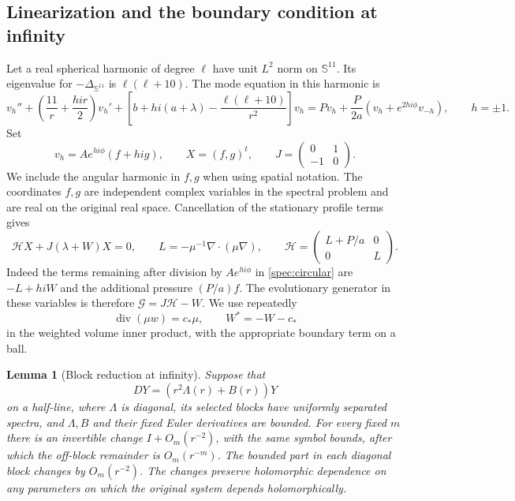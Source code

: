 \documentclass[11pt]{article}
\numberwithin{equation}{section}
\newtheorem{lemma}[theorem]{Lemma}
\theoremstyle{definition}
\theoremstyle{remark}
\begin{document}
\subsection{Linearization and the boundary condition at infinity}

Let a real spherical harmonic of degree $\ell$ have unit $L^2$ norm on
$\mathbb S^{11}$. Its eigenvalue for $-\Delta_{\mathbb S^{11}}$ is
$\ell(\ell+10)$. The mode equation in this harmonic is
\begin{equation}\label{spec:circular}
 v_h''+\left(\frac{11}{r}+\frac{hi r}{2}\right)v_h'
 +\left[b+hi(a+\lambda)-\frac{\ell(\ell+10)}{r^2}\right]v_h
 =Pv_h+\frac{P}{2a}(v_h+e^{2hi\phi}v_{-h}),\qquad h=\pm1.
\end{equation}
Set
\[
 v_h=Ae^{hi\phi}(f+hi g),\qquad X=(f,g)^t,
 \qquad J=\begin{pmatrix}0&1\\-1&0\end{pmatrix}.
\]
We include the angular harmonic in $f,g$ when using spatial notation.
The coordinates $f,g$ are independent complex variables in the spectral
problem and are real on the original real space.
Cancellation of the stationary profile terms gives
\begin{equation}\label{spec:real-system}
 \mathcal H X+J(\lambda+W)X=0,\qquad
 L=-\mu^{-1}\nabla\cdot(\mu\nabla),\qquad
 \mathcal H=\begin{pmatrix}L+P/a&0\\0&L\end{pmatrix}.
\end{equation}
Indeed the terms remaining after division by $Ae^{hi\phi}$ in
\eqref{spec:circular} are $-L+hiW$ and the additional pressure
$(P/a)f$. The evolutionary generator in these variables is therefore
$\mathcal G=J\mathcal H-W$. We use repeatedly
\begin{equation}\label{spec:divergence}
 \operatorname{div}(\mu w)=c_*\mu,
 \qquad W^*=-W-c_*
\end{equation}
in the weighted volume inner product, with the appropriate boundary
term on a ball.

\begin{lemma}[Block reduction at infinity]\label{spec:block-reduction}
Suppose that
\[
 DY=(r^2\Lambda(r)+B(r))Y
\]
on a half-line, where $\Lambda$ is diagonal, its selected blocks have
uniformly separated spectra, and $\Lambda,B$ and their fixed Euler
derivatives are bounded. For every fixed $m$ there is an invertible
change $I+O_m(r^{-2})$, with the same symbol bounds, after which the
off-block remainder is $O_m(r^{-m})$. The bounded part in each diagonal
block changes by $O_m(r^{-2})$. The changes preserve holomorphic
dependence on any parameters on which the original system depends
holomorphically.
\end{lemma}
\end{document}
